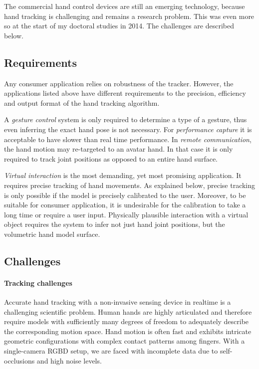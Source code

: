 The commercial hand control devices are still an emerging technology, because hand tracking is challenging and remains a research problem. This was even more so at the start of my doctoral studies in 2014. The challenges are described below.

\subsection*{Requirements}

Any consumer application relies on robustness of the tracker. However, the applications listed above have different requirements to the precision, efficiency and output format of the hand tracking algorithm.

A \textit{gesture control} system is only required to determine a type of a gesture, thus even inferring the exact hand pose is not necessary. For \textit{performance capture} it is acceptable to have slower than real time performance. In \textit{remote communication}, the hand motion may re-targeted to an avatar hand. In that case it is only required to track joint positions as opposed to an entire hand surface.

\textit{Virtual interaction} is the most demanding, yet most promising application. It requires precise tracking of hand movements. As explained below, precise tracking is only possible if the model is precisely calibrated to the user. Moreover, to be suitable for consumer application, it is undesirable for the calibration to take a long time or require a user input. Physically plausible interaction with a virtual object requires the system to infer not just hand joint positions, but the volumetric hand model surface.

\subsection*{Challenges}

\paragraph{Tracking challenges} Accurate hand tracking with a non-invasive sensing device in realtime is a challenging scientific problem. Human hands are highly articulated and therefore require models with sufficiently many degrees of freedom to adequately describe the corresponding motion space. Hand motion is often fast and exhibits intricate geometric configurations with complex contact patterns among fingers. With a single-camera RGBD setup, we are faced with incomplete data due to self-occlusions and high noise levels.  

